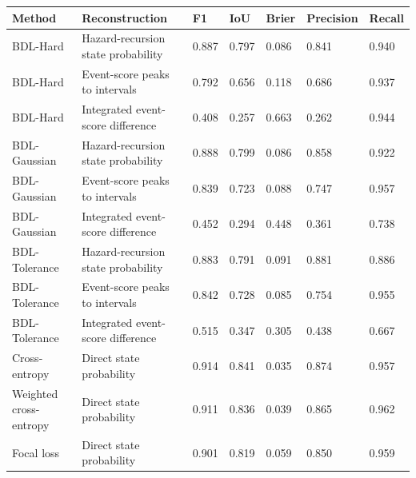 \begin{tabular}{lllllll}
\toprule
Method & Reconstruction & F1 & IoU & Brier & Precision & Recall \\
\midrule
BDL-Hard & Hazard-recursion state probability & 0.887 & 0.797 & 0.086 & 0.841 & 0.940 \\
BDL-Hard & Event-score peaks to intervals & 0.792 & 0.656 & 0.118 & 0.686 & 0.937 \\
BDL-Hard & Integrated event-score difference & 0.408 & 0.257 & 0.663 & 0.262 & 0.944 \\
BDL-Gaussian & Hazard-recursion state probability & 0.888 & 0.799 & 0.086 & 0.858 & 0.922 \\
BDL-Gaussian & Event-score peaks to intervals & 0.839 & 0.723 & 0.088 & 0.747 & 0.957 \\
BDL-Gaussian & Integrated event-score difference & 0.452 & 0.294 & 0.448 & 0.361 & 0.738 \\
BDL-Tolerance & Hazard-recursion state probability & 0.883 & 0.791 & 0.091 & 0.881 & 0.886 \\
BDL-Tolerance & Event-score peaks to intervals & 0.842 & 0.728 & 0.085 & 0.754 & 0.955 \\
BDL-Tolerance & Integrated event-score difference & 0.515 & 0.347 & 0.305 & 0.438 & 0.667 \\
Cross-entropy & Direct state probability & 0.914 & 0.841 & 0.035 & 0.874 & 0.957 \\
Weighted cross-entropy & Direct state probability & 0.911 & 0.836 & 0.039 & 0.865 & 0.962 \\
Focal loss & Direct state probability & 0.901 & 0.819 & 0.059 & 0.850 & 0.959 \\
\bottomrule
\end{tabular}
